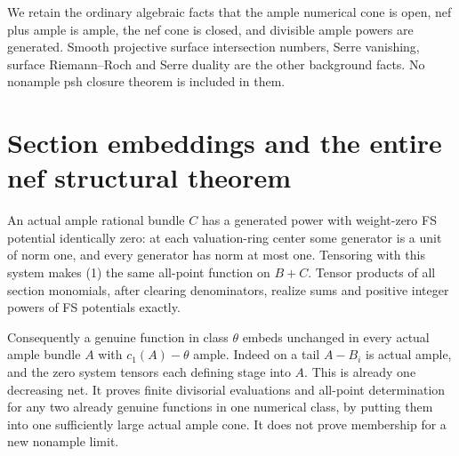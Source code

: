 \documentclass[11pt]{article}
\begin{document}
We retain the ordinary algebraic facts that the ample numerical cone
is open, nef plus ample is ample, the nef cone is closed, and
divisible ample powers are generated. Smooth projective surface
intersection numbers, Serre vanishing, surface Riemann--Roch and
Serre duality are the other background facts. No nonample psh
closure theorem is included in them.

\section{Section embeddings and the entire nef structural theorem}
An actual ample rational bundle $C$ has a generated power with
weight-zero FS potential identically zero: at each valuation-ring
center some generator is a unit of norm one, and every generator
has norm at most one. Tensoring with this system makes (1) the same
all-point function on $B+C$. Tensor products of all section monomials,
after clearing denominators, realize sums and positive integer
powers of FS potentials exactly.

Consequently a genuine function in class $\theta$ embeds unchanged
in every actual ample bundle $A$ with $c_1(A)-\theta$ ample. Indeed
on a tail $A-B_i$ is actual ample, and the zero system tensors each
defining stage into $A$. This is already one decreasing net.
It proves finite divisorial evaluations and all-point determination
for any two already genuine functions in one numerical class,
by putting them into one sufficiently large actual ample cone.
It does not prove membership for a new nonample limit.
\end{document}
